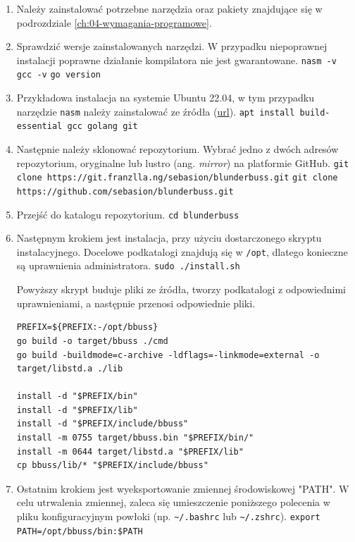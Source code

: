 \begin{enumerate}
    \raggedright
    \item Należy zainstalować potrzebne narzędzia oraz pakiety znajdujące się w podrozdziale \ref{ch:04-wymagania-programowe}.
    \item Sprawdzić wersje zainstalowanych narzędzi. W przypadku niepoprawnej instalacji poprawne działanie kompilatora nie jest gwarantowane.
    \break\verb|nasm -v|
    \break\verb|gcc -v|
    \break\verb|go version|
    \item Przykładowa instalacja na systemie Ubuntu 22.04, w tym przypadku narzędzie \verb|nasm| należy zainstalować ze źródła (\href{https://www.nasm.us/pub/nasm/releasebuilds/3.01/}{url}). \break\verb|apt install build-essential gcc golang git|
    \item Następnie należy sklonować repozytorium. Wybrać jedno z dwóch adresów repozytorium, oryginalne lub lustro (ang. \textit{mirror}) na platformie GitHub.
    \break\verb|git clone https://git.franzlla.ng/sebasion/blunderbuss.git|
    \break\verb|git clone https://github.com/sebasion/blunderbuss.git|
    \item Przejść do katalogu repozytorium.
    \break\verb|cd blunderbuss|
    \item Następnym krokiem jest instalacja, przy użyciu dostarczonego skryptu instalacyjnego. Docelowe podkatalogi znajdują się w \verb|/opt|, dlatego konieczne są uprawnienia administratora.
    \break\verb|sudo ./install.sh|

        Powyższy skrypt buduje pliki ze źródła, tworzy podkatalogi z odpowiednimi uprawnieniami, a następnie przenosi odpowiednie pliki.
\begin{lstlisting}[caption={Fragment skryptu instalującego}, label={lst:install-script}]
PREFIX=${PREFIX:-/opt/bbuss}
go build -o target/bbuss ./cmd
go build -buildmode=c-archive -ldflags=-linkmode=external -o target/libstd.a ./lib

install -d "$PREFIX/bin"
install -d "$PREFIX/lib"
install -d "$PREFIX/include/bbuss"
install -m 0755 target/bbuss.bin "$PREFIX/bin/"
install -m 0644 target/libstd.a "$PREFIX/lib"
cp bbuss/lib/* "$PREFIX/include/bbuss"
\end{lstlisting}
    \item Ostatnim krokiem jest wyeksportowanie zmiennej środowiskowej "PATH". W celu utrwalenia zmiennej, zaleca się umieszczenie poniższego polecenia w pliku konfiguracyjnym powłoki (np. \verb|~/.bashrc| lub \verb|~/.zshrc|).
    \break\verb|export PATH=/opt/bbuss/bin:$PATH|
\end{enumerate}

